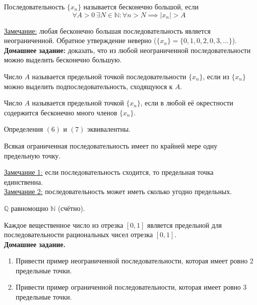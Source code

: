 \documentclass{article}
\begin{document}
\begin{definition}
    Последовательность \(\{x_n\}\) называется бесконечно большой, если
    \[
        \forall A > 0\ \exists N \in \mathbb{N}: \forall n > N \implies \left\vert x_n \right\vert > A
    \] 
\end{definition}
\noindent \underline{Замечание:} любая бесконечно большая последовательность является неограниченной. Обратное утверждение неверно (\(\{x_n\} = \{0, 1, 0, 2, 0, 3, \dots\}\)).\\
\textbf{Домашнее задание:} доказать, что из любой неограниченной последовательности можно выделить бесконечно большую.

\begin{definition}
    Число \(A\) называется предельной точкой последовательности \(\{x_n\}\), если из \(\{x_n\}\) можно выделить подпоследовательность, сходящуюся к \(A\).    
\end{definition}

\begin{definition}
    Число \(A\) называется предельной точкой \(\{x_n\}\), если в любой её окрестности содержится бесконечно много членов \(\{x_n\}\).  
\end{definition}

\begin{claim}
    Определения \({(6)}\) и \({(7)}\) эквивалентны.
\end{claim}

\begin{claim}
    Всякая ограниченная последовательность имеет по крайней мере одну предельную точку.
\end{claim}
\noindent \underline{Замечание 1:} если последовательность сходится, то предельная точка единственна.\\
\underline{Замечание 2:} последовательность может иметь сколько угодно предельных.

\begin{claim}
    \(\mathbb{Q}\) равномощно \(\mathbb{N}\) (счётно).  
\end{claim}

\noindent Каждое вещественное число из отрезка \({[0, 1]}\) является предельной для последовательности рациональных чисел отрезка \({[0, 1]}\).\\
\textbf{Домашнее задание.}
\begin{enumerate}
    \item Привести пример неограниченной последовательности, которая имеет ровно 2 предельные точки. 
    \item Привести пример ограниченной последовательности, которая имеет ровно 3 предельные точки. 
\end{enumerate}
\end{document}
